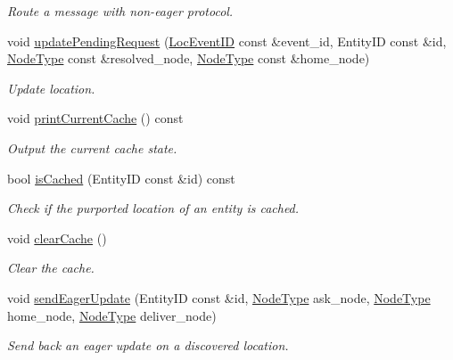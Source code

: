 \begin{DoxyCompactItemize}
\begin{DoxyCompactList}\small\item\em Route a message with non-\/eager protocol. \end{DoxyCompactList}\item 
void \hyperlink{structvt_1_1location_1_1_entity_location_coord_a96e4c5c2a943450554b17c34f05995d0}{update\+Pending\+Request} (\hyperlink{namespacevt_1_1location_aa5ccc1a42aa22b0b41fcfbbdee314dca}{Loc\+Event\+ID} const \&event\+\_\+id, Entity\+ID const \&id, \hyperlink{namespacevt_a866da9d0efc19c0a1ce79e9e492f47e2}{Node\+Type} const \&resolved\+\_\+node, \hyperlink{namespacevt_a866da9d0efc19c0a1ce79e9e492f47e2}{Node\+Type} const \&home\+\_\+node)
\begin{DoxyCompactList}\small\item\em Update location. \end{DoxyCompactList}\item 
void \hyperlink{structvt_1_1location_1_1_entity_location_coord_a33f2bf9523cfc89fae0f1151fa2d87db}{print\+Current\+Cache} () const
\begin{DoxyCompactList}\small\item\em Output the current cache state. \end{DoxyCompactList}\item 
bool \hyperlink{structvt_1_1location_1_1_entity_location_coord_a9e6d5b9783f617f4e036ad9f7ba19953}{is\+Cached} (Entity\+ID const \&id) const
\begin{DoxyCompactList}\small\item\em Check if the purported location of an entity is cached. \end{DoxyCompactList}\item 
void \hyperlink{structvt_1_1location_1_1_entity_location_coord_ac20c510b73a5f6f753269b6d05b389aa}{clear\+Cache} ()
\begin{DoxyCompactList}\small\item\em Clear the cache. \end{DoxyCompactList}\item 
void \hyperlink{structvt_1_1location_1_1_entity_location_coord_a9903f0c4581b9d8a231293e98cf9a11c}{send\+Eager\+Update} (Entity\+ID const \&id, \hyperlink{namespacevt_a866da9d0efc19c0a1ce79e9e492f47e2}{Node\+Type} ask\+\_\+node, \hyperlink{namespacevt_a866da9d0efc19c0a1ce79e9e492f47e2}{Node\+Type} home\+\_\+node, \hyperlink{namespacevt_a866da9d0efc19c0a1ce79e9e492f47e2}{Node\+Type} deliver\+\_\+node)
\begin{DoxyCompactList}\small\item\em Send back an eager update on a discovered location. \end{DoxyCompactList}\item 

\end{DoxyCompactItemize}
